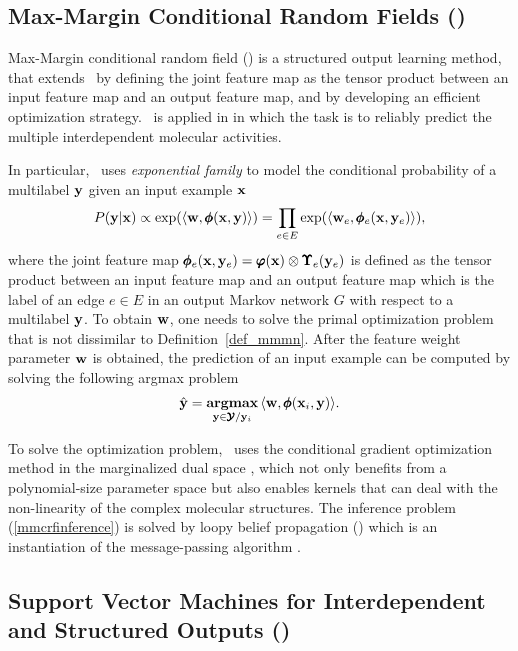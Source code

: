 {%
%
\subsection{Max-Margin Conditional Random Fields (\mmcrf)} \label{sc_mmcrf}

Max-Margin conditional random field (\mmcrf) \citep{Rousu07} is a structured output learning method, that extends \mmmn\ by defining the joint feature map as the tensor product between an input feature map and an output feature map, and by developing an efficient optimization strategy. 
\mmcrf\ is applied in  in which the task is to reliably predict the multiple interdependent molecular activities.

In particular, \mmcrf\ uses \textit{exponential family} to model the conditional probability of a multilabel $\mathbf {y}$ given an input example $\mathbf {x}$
\begin{align*}
	P(\mathbf {y}|\mathbf {x}) \propto \exp(\langle \mathbf {w}, \pmb \phi(\mathbf {x},\mathbf {y}) \rangle) = \prod_{e\in E}\exp(\langle \mathbf {w}_e, \pmb \phi_e(\mathbf {x},\mathbf {y}_e) \rangle),
\end{align*}
where the joint feature map $\pmb \phi_e(\mathbf {x},\mathbf {y}_e)=\pmb \varphi(\mathbf {x})\otimes\pmb \Upsilon_e(\mathbf {y}_e)$ is defined as the tensor product between an input feature map and an output feature map which is the label of an edge $e\in E$ in an output Markov network $G$ with respect to a multilabel $\mathbf {y}$. 
To obtain $\mathbf {w}$, one needs to solve the primal optimization problem that is not dissimilar to Definition~\ref{def_mmmn}.
After the feature weight parameter $\mathbf {w}$ is obtained, the prediction of an input example can be computed by solving the following argmax problem
\begin{align}
	\hat{\mathbf {y}} = \underset{\mathbf {y}\in\pmb {\mathcal{Y}}/\mathbf {y}_i}{\textbf{argmax}} \, \langle \mathbf {w}, \pmb \phi(\mathbf {x}_i,\mathbf {y}) \rangle.\label{mmcrfinference}
\end{align}

To solve the optimization problem, \mmcrf\ uses the conditional gradient optimization method \citep{Bertsekas95nonlinear} in the marginalized dual space \citep{Taskar04max}, which not only benefits from a polynomial-size parameter space but also enables kernels that can deal with the non-linearity of the complex molecular structures.
The inference problem (\ref{mmcrfinference}) is solved by loopy belief propagation (\lbp) which is an instantiation of the message-passing algorithm \citep{Wainwright08graphical}.



%
% 
\subsection{Support Vector Machines for Interdependent and Structured Outputs (\svmstruct)} \label{sc_svmstruct}

}
